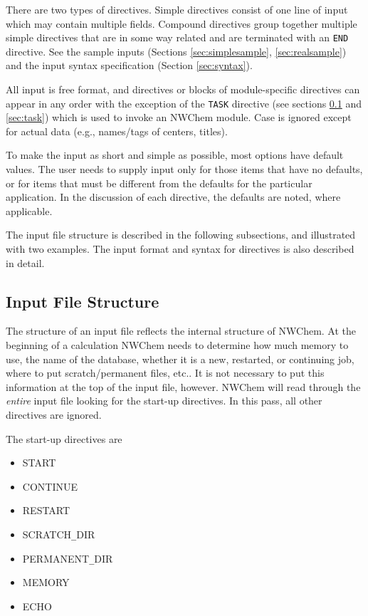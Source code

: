 There are two types of directives.  Simple directives consist of one
line of input which may contain multiple fields.  Compound directives
group together multiple simple directives that are in some way
related and are terminated with an \verb+END+ directive.  See the
sample inputs (Sections \ref{sec:simplesample}, \ref{sec:realsample})
and the input syntax specification (Section \ref{sec:syntax}).

All input is free format, and directives or blocks of module-specific
directives can appear in any order with the exception of the
\verb+TASK+ directive (see sections \ref{sec:inputstructure} and
\ref{sec:task}) which is used to invoke an NWChem module.  Case is
ignored except for actual data (e.g., names/tags of centers, titles).

To make the input as short and simple as possible, most options have
default values.  The user needs to supply input only for those items that
have no defaults, or for items that must be different from the defaults
for the particular application.  In the discussion of each directive, the
defaults are noted, where applicable.

The input file structure is described in the following subsections, and
illustrated with two examples.  The input format and syntax for directives
is also described in detail.

\subsection{Input File Structure}
\label{sec:inputstructure}

The structure of an input file reflects the internal structure of
NWChem.  At the beginning of a calculation NWChem needs to determine
how much memory to use, the name of the database, whether it is a new,
restarted, or continuing job, where to put scratch/permanent files,
etc..  It is not necessary to put this information at the top of the
input file, however.  NWChem will read through the {\em entire} input
file looking for the start-up directives.  In this pass, all other
directives are ignored.

The start-up directives are
\begin{itemize}
\item START
\item CONTINUE
\item RESTART
\item SCRATCH{\verb+_+}DIR
\item PERMANENT{\verb+_+}DIR
\item MEMORY
\item ECHO
\end{itemize}

